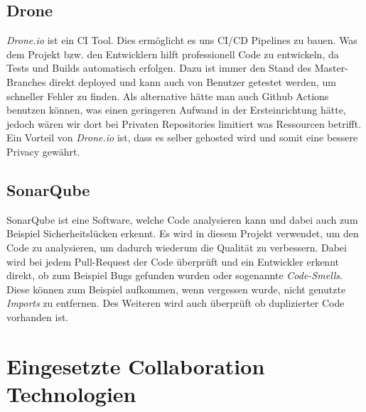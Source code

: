 \subsection{Drone}
    \textit{Drone.io} ist ein \ac{CI} Tool. Dies ermöglicht es uns \ac{CI/CD} Pipelines zu bauen. Was dem Projekt bzw. den Entwicklern hilft professionell Code zu entwickeln, da Tests und Builds automatisch erfolgen.
    Dazu ist immer den Stand des Master-Branches direkt deployed und kann auch von Benutzer getestet werden, um schneller Fehler zu finden. Als alternative hätte man auch Github Actions benutzen können, was einen geringeren
    Aufwand in der Ersteinrichtung hätte, jedoch wären wir dort bei Privaten Repositories limitiert was Ressourcen betrifft. Ein Vorteil von \textit{Drone.io} ist, dass es selber gehosted wird und somit eine bessere Privacy gewährt.
\subsection{SonarQube}
    SonarQube ist eine Software, welche Code analysieren kann und dabei auch zum Beispiel Sicherheitslücken erkennt.
    Es wird in diesem Projekt verwendet, um den Code zu analysieren, um dadurch wiederum die Qualität zu verbessern.
    Dabei wird bei jedem Pull-Request der Code überprüft und ein Entwickler erkennt direkt, ob zum Beispiel Bugs gefunden wurden oder sogenannte \textit{Code-Smells}. 
    Diese können zum Beispiel aufkommen, wenn vergessen wurde, nicht genutzte \textit{Imports} zu entfernen.
    Des Weiteren wird auch überprüft ob duplizierter Code vorhanden ist.

\section{Eingesetzte Collaboration Technologien} 

